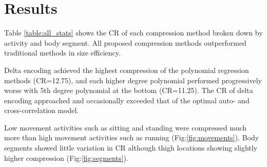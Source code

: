 \documentclass[journal]{IEEEtran}
\begin{document}
\section{Results}

Table \ref{table:all_stats} shows the CR of each compression method broken down by activity and body segment. All proposed compression methods outperformed traditional methods in size efficiency.

Delta encoding achieved the highest compression of the polynomial regression methods (CR=12.75), and each higher degree polynomial performed progressively worse with 5th degree polynomial at the bottom (CR=11.25). The CR of delta encoding approached and occasionally exceeded that of the optimal auto- and cross-correlation model.

Low movement activities such as sitting and standing were compressed much more than high movement activities such as running (Fig:\ref{fig:movements}). Body segments showed little variation in CR although thigh locations showing slightly higher compression (Fig:\ref{fig:segments}).
\end{document}
